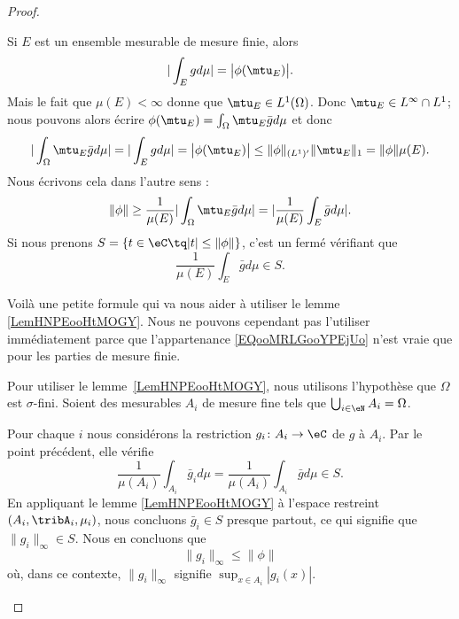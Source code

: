 \begin{proof}
\begin{subproof}
		\spitem[Si \( p=1\), une formule]
		Si \( E\) est un ensemble mesurable de mesure finie, alors
		\begin{equation}
			| \int_Egd\mu |=\big| \phi(\mtu_E) \big|.
		\end{equation}
		Mais le fait que \( \mu(E)<\infty\) donne que \( \mtu_E\in L^1(\Omega)\). Donc \( \mtu_E\in L^{\infty}\cap L^1\); nous pouvons alors écrire \( \phi(\mtu_E)=\int_{\Omega}\mtu_E\bar gd\mu\) et donc
		\begin{equation}    \label{EqUPCTooJvoKKI}
			| \int_{\Omega}\mtu_E\bar gd\mu |=|\int_Egd\mu |=\big| \phi(\mtu_E) \big|\leq \| \phi \|_{(L^1)'}\| \mtu_E \|_1=\| \phi \|\mu(E).
		\end{equation}
		Nous écrivons cela dans l'autre sens :
		\begin{equation}
			\| \phi \|\geq \frac{1}{ \mu(E) }| \int_{\Omega}\mtu_E\bar gd\mu |=| \frac{1}{ \mu(E) }\int_E\bar gd\mu |.
		\end{equation}
		Si nous prenons \( S=\{ t\in \eC\tq | t |\leq \| \phi \| \}\), c'est un fermé vérifiant que
		\begin{equation}        \label{EQooMRLGooYPEjUo}
			\frac{1}{ \mu(E) }\int_E\bar gd\mu\in S.
		\end{equation}

		Voilà une petite formule qui va nous aider à utiliser le lemme \ref{LemHNPEooHtMOGY}. Nous ne pouvons cependant pas l'utiliser immédiatement parce que l'appartenance \eqref{EQooMRLGooYPEjUo} n'est vraie que pour les parties de mesure finie.

		\spitem[Si \( p=1\), conclusion\cite{MonCerveau}]

		Pour utiliser le lemme~\ref{LemHNPEooHtMOGY}, nous utilisons l'hypothèse que \( \Omega\) est \( \sigma\)-fini. Soient des mesurables \( A_i\) de mesure fine tels que \( \bigcup_{i\in \eN}A_i=\Omega\).

		Pour chaque \( i\) nous considérons la restriction \( g_i\colon A_i\to \eC\) de \( g\) à \( A_i\). Par le point précédent, elle vérifie
		\begin{equation}
			\frac{1}{ \mu(A_i) }\int_{A_i}\bar g_id\mu=\frac{1}{ \mu(A_i) }\int_{A_i}\bar gd\mu\in S.
		\end{equation}
		En appliquant le lemme \ref{LemHNPEooHtMOGY} à l'espace restreint \( (A_i,\tribA_i,\mu_i)\), nous concluons \( \bar g_i\in S\) presque partout, ce qui signifie que \( \| g_i \|_{\infty}\in S\). Nous en concluons que
		\begin{equation}
			\| g_i \|_{\infty}\leq \| \phi \|
		\end{equation}
		où, dans ce contexte, \( \| g_i \|_{\infty}\) signifie \( \sup_{x\in A_i}| g_i(x) |\).


\end{subproof}
\end{proof}

